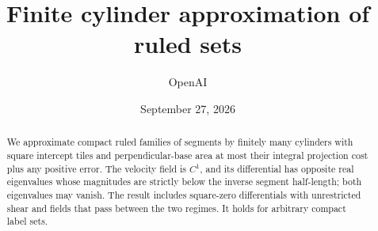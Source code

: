 \documentclass[11pt]{article}
\title{Finite cylinder approximation of ruled sets}
\author{OpenAI}
\date{September 27, 2026}
\theoremstyle{remark}
\numberwithin{equation}{section}
\begin{document}
\maketitle
\begin{abstract}
We approximate compact ruled families of segments by finitely many
cylinders with square intercept tiles and perpendicular-base area at
most their integral projection cost plus any positive error. The
velocity field is $C^1$, and its differential has opposite real
eigenvalues whose magnitudes are strictly below the inverse segment
half-length; both eigenvalues may vanish. The result includes
square-zero differentials with unrestricted shear and fields that
pass between the two regimes. It holds for arbitrary compact label
sets.
\end{abstract}





\begingroup\raggedright


\endgroup
\end{document}
